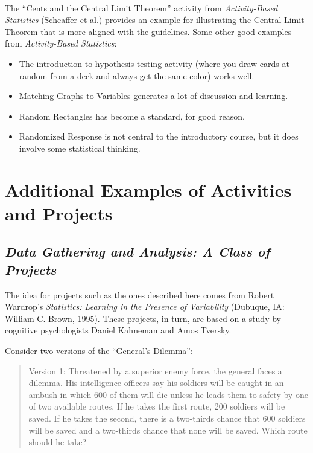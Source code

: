 \vspace{.25in}

\noindent{} \\ 
\vspace{.1in}
The ``Cents and the Central Limit Theorem'' activity from \textit{Activity-Based Statistics} (Scheaffer et al.) provides an example for illustrating the Central Limit Theorem that is more aligned with the guidelines. Some other good examples from \textit{Activity-Based Statistics}:
\begin{itemize}[leftmargin=1cm, itemsep=.2em]
\item The introduction to hypothesis testing activity (where you draw cards at random from a deck and always get the same color) works well.
\item Matching Graphs to Variables generates a lot of discussion and learning.
\item Random Rectangles has become a standard, for good reason.
\item Randomized Response is not central to the introductory course, but it does involve some statistical thinking.
\end{itemize}

\section{\textbf{Additional Examples of Activities and Projects}}

\subsection{\textbf{\textit{Data Gathering and Analysis:  A Class of Projects}}}
The idea for projects such as the ones described here comes from Robert Wardrop's \textit{Statistics:  Learning in the Presence of Variability} (Dubuque, IA:  William C. Brown, 1995). These projects, in turn, are based on a study by cognitive psychologists Daniel Kahneman and Amos Tversky.

Consider two versions of the ``General's Dilemma'':

\begin{quotation}
Version 1:  Threatened by a superior enemy force, the general faces a dilemma. His intelligence officers say his soldiers will be caught in an ambush in which 600 of them will die unless he leads them to safety by one of two available routes.  If he takes the first route, 200 soldiers will be saved.  If he takes the second, there is a two-thirds chance that 600 soldiers will be saved and a two-thirds chance that none will be saved.  Which route should he take?
\end{quotation}

